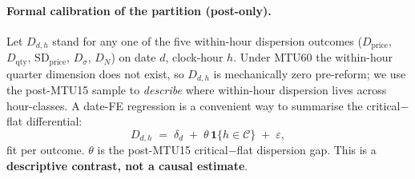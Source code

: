 \documentclass[11pt]{article}
\begin{document}
\paragraph{Formal calibration of the partition (post-only).} Let $D_{d,h}$ stand for any one of the five within-hour dispersion outcomes ($D_{\text{price}}$, $D_{\text{qty}}$, $\text{SD}_{\text{price}}$, $D_\sigma$, $D_N$) on date $d$, clock-hour $h$. Under MTU60 the within-hour quarter dimension does not exist, so $D_{d,h}$ is mechanically zero pre-reform; we use the post-MTU15 sample to \emph{describe} where within-hour dispersion lives across hour-classes. A date-FE regression is a convenient way to summarise the critical$-$flat differential:
\[
D_{d,h} \;=\; \delta_d \;+\; \theta\,\mathbf{1}\{h\in\mathcal{C}\} \;+\; \varepsilon,
\]
fit per outcome. $\theta$ is the post-MTU15 critical$-$flat dispersion gap. This is a \textbf{descriptive contrast, not a causal estimate}.
\end{document}

